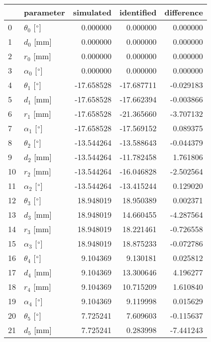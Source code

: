 \documentclass{standalone}%
\begin{document}
%
\normalsize%
\begin{tabular}{llrrr}
\toprule
{} &                 parameter &  simulated & identified & difference \\
\midrule
0  &  $\theta_{0}$ [$\degree$] &   0.000000 &   0.000000 &   0.000000 \\
1  &              $d_{0}$ [mm] &   0.000000 &   0.000000 &   0.000000 \\
2  &              $r_{0}$ [mm] &   0.000000 &   0.000000 &   0.000000 \\
3  &  $\alpha_{0}$ [$\degree$] &   0.000000 &   0.000000 &   0.000000 \\
4  &  $\theta_{1}$ [$\degree$] & -17.658528 & -17.687711 &  -0.029183 \\
5  &              $d_{1}$ [mm] & -17.658528 & -17.662394 &  -0.003866 \\
6  &              $r_{1}$ [mm] & -17.658528 & -21.365660 &  -3.707132 \\
7  &  $\alpha_{1}$ [$\degree$] & -17.658528 & -17.569152 &   0.089375 \\
8  &  $\theta_{2}$ [$\degree$] & -13.544264 & -13.588643 &  -0.044379 \\
9  &              $d_{2}$ [mm] & -13.544264 & -11.782458 &   1.761806 \\
10 &              $r_{2}$ [mm] & -13.544264 & -16.046828 &  -2.502564 \\
11 &  $\alpha_{2}$ [$\degree$] & -13.544264 & -13.415244 &   0.129020 \\
12 &  $\theta_{3}$ [$\degree$] &  18.948019 &  18.950389 &   0.002371 \\
13 &              $d_{3}$ [mm] &  18.948019 &  14.660455 &  -4.287564 \\
14 &              $r_{3}$ [mm] &  18.948019 &  18.221461 &  -0.726558 \\
15 &  $\alpha_{3}$ [$\degree$] &  18.948019 &  18.875233 &  -0.072786 \\
16 &  $\theta_{4}$ [$\degree$] &   9.104369 &   9.130181 &   0.025812 \\
17 &              $d_{4}$ [mm] &   9.104369 &  13.300646 &   4.196277 \\
18 &              $r_{4}$ [mm] &   9.104369 &  10.715209 &   1.610840 \\
19 &  $\alpha_{4}$ [$\degree$] &   9.104369 &   9.119998 &   0.015629 \\
20 &  $\theta_{5}$ [$\degree$] &   7.725241 &   7.609603 &  -0.115637 \\
21 &              $d_{5}$ [mm] &   7.725241 &   0.283998 &  -7.441243 \\

\end{tabular}
\end{document}
